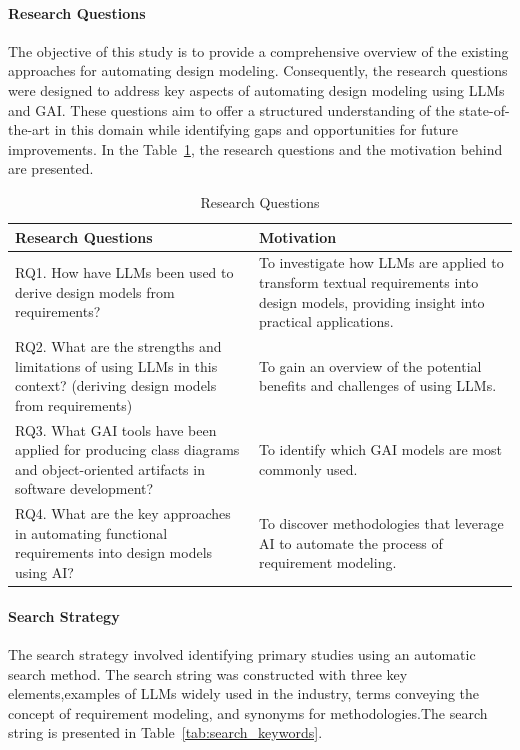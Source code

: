 \paragraph{Research Questions}
The objective of this study is to provide a comprehensive overview of the existing approaches for automating design modeling. Consequently, the research questions were designed to address key aspects of automating design modeling using LLMs and GAI. These questions aim to offer a structured understanding of the state-of-the-art in this domain while identifying gaps and opportunities for future improvements.
In the Table~\ref{tab:research_questions}, the research questions and the motivation behind are presented.	
\begin{table}[htb]
  \centering
  \begin{tabular}{p{6cm} p{8cm}}
    \toprule
    \textbf{Research Questions} & \textbf{Motivation} \\ 
    \midrule
    RQ1. How have LLMs been used to derive design models from requirements? & To investigate how LLMs are applied to transform textual requirements into design models, providing insight into practical applications. \\ 
    \addlinespace
    \midrule
    RQ2. What are the strengths and limitations of using LLMs in this context? (deriving design models from requirements) & To gain an overview of the potential benefits and challenges of using LLMs. \\ 
    \addlinespace
    \midrule
    RQ3. What GAI tools have been applied for producing class diagrams and object-oriented artifacts in software development? & To identify which GAI models are most commonly used. \\ 
    \addlinespace
    \midrule
    RQ4. What are the key approaches in automating functional requirements into design models using AI? & To discover methodologies that leverage AI to automate the process of requirement modeling. \\ 
    \bottomrule
  \end{tabular}
  \caption{Research Questions}
  \label{tab:research_questions} %
  \end{table}
  

\paragraph{Search Strategy}
The search strategy involved identifying primary studies using an automatic search method. The search string was constructed with three key elements,examples of LLMs widely used in the industry, terms conveying the concept of requirement modeling, and synonyms for methodologies.The search string is presented in Table~\ref{tab:search_keywords}.

